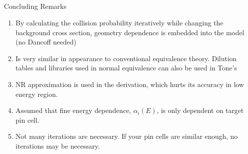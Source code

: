 \documentclass{beamer}
\begin{document}
\subsection*{}
\begin{frame}{Concluding Remarks}
  \begin{enumerate}
    \item By calculating the collision probability iteratively while changing the background cross section, geometry dependence is embedded into the model (no Dancoff needed)
    \item Is very similar in appearance to conventional equivalence theory. Dilution tables and libraries used in normal equivalence can also be used in Tone's
    \item NR approximation is used in the derivation, which hurts its accuracy in low energy region. 
    \item Assumed that fine energy dependence, $\alpha_i(E)$, is only dependent on target pin cell.
    \item Not many iterations are necessary. If your pin cells are similar enough, no iterations may be necessary.
  \end{enumerate}

\end{frame}






\begin{frame}
\end{frame}





\begin{frame}
\end{frame}
\end{document}
